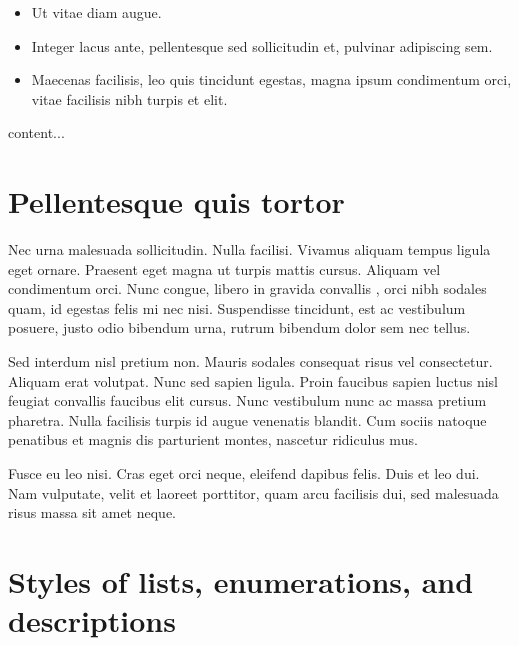 \documentclass[a4paper,UKenglish,cleveref, autoref]{lipics-v2019}
\begin{document}
\begin{itemize}
\item Ut vitae diam augue. 
\item Integer lacus ante, pellentesque sed sollicitudin et, pulvinar adipiscing sem. 
\item Maecenas facilisis, leo quis tincidunt egestas, magna ipsum condimentum orci, vitae facilisis nibh turpis et elit. 
\end{itemize}

\begin{remark}
content...
\end{remark}

\section{Pellentesque quis tortor}

Nec urna malesuada sollicitudin. Nulla facilisi. Vivamus aliquam tempus ligula eget ornare. Praesent eget magna ut turpis mattis cursus. Aliquam vel condimentum orci. Nunc congue, libero in gravida convallis , orci nibh sodales quam, id egestas felis mi nec nisi. Suspendisse tincidunt, est ac vestibulum posuere, justo odio bibendum urna, rutrum bibendum dolor sem nec tellus. 

\begin{lemma} 
Sed interdum nisl pretium non. Mauris sodales consequat risus vel consectetur. Aliquam erat volutpat. Nunc sed sapien ligula. Proin faucibus sapien luctus nisl feugiat convallis faucibus elit cursus. Nunc vestibulum nunc ac massa pretium pharetra. Nulla facilisis turpis id augue venenatis blandit. Cum sociis natoque penatibus et magnis dis parturient montes, nascetur ridiculus mus.
\end{lemma}

Fusce eu leo nisi. Cras eget orci neque, eleifend dapibus felis. Duis et leo dui. Nam vulputate, velit et laoreet porttitor, quam arcu facilisis dui, sed malesuada risus massa sit amet neque.
%





\appendix

\section{Styles of lists, enumerations, and descriptions}
\end{document}
